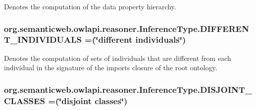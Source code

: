 Denotes the computation of the data property hierarchy. \hypertarget{enumorg_1_1semanticweb_1_1owlapi_1_1reasoner_1_1_inference_type_a5667bc8a13ed1176f98a4b6a1fb7db05}{
\subsubsection[{D\-I\-F\-F\-E\-R\-E\-N\-T\-\_\-\-I\-N\-D\-I\-V\-I\-D\-U\-A\-L\-S}]{\setlength{\rightskip}{0pt plus 5cm}org.\-semanticweb.\-owlapi.\-reasoner.\-Inference\-Type.\-D\-I\-F\-F\-E\-R\-E\-N\-T\-\_\-\-I\-N\-D\-I\-V\-I\-D\-U\-A\-L\-S =(\char`\"{}different individuals\char`\"{})}}\label{enumorg_1_1semanticweb_1_1owlapi_1_1reasoner_1_1_inference_type_a5667bc8a13ed1176f98a4b6a1fb7db05}
Denotes the computation of sets of individuals that are different from each individual in the signature of the imports closure of the root ontology. \hypertarget{enumorg_1_1semanticweb_1_1owlapi_1_1reasoner_1_1_inference_type_a2526984b676d7b1fa397969a16c8dd84}{
\subsubsection[{D\-I\-S\-J\-O\-I\-N\-T\-\_\-\-C\-L\-A\-S\-S\-E\-S}]{\setlength{\rightskip}{0pt plus 5cm}org.\-semanticweb.\-owlapi.\-reasoner.\-Inference\-Type.\-D\-I\-S\-J\-O\-I\-N\-T\-\_\-\-C\-L\-A\-S\-S\-E\-S =(\char`\"{}disjoint classes\char`\"{})}}\label{enumorg_1_1semanticweb_1_1owlapi_1_1reasoner_1_1_inference_type_a2526984b676d7b1fa397969a16c8dd84}
